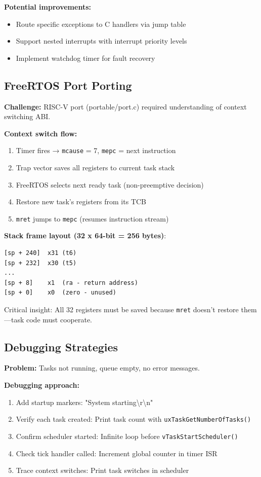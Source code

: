 \documentclass[conference]{IEEEtran}
\begin{document}
\textbf{Potential improvements:} 
\begin{itemize}
    \item Route specific exceptions to C handlers via jump table
    \item Support nested interrupts with interrupt priority levels
    \item Implement watchdog timer for fault recovery
\end{itemize}

\subsection{FreeRTOS Port Porting}
\textbf{Challenge:} RISC-V port (portable/port.c) required understanding of context switching ABI.

\textbf{Context switch flow:}
\begin{enumerate}
    \item Timer fires → \texttt{mcause} = 7, \texttt{mepc} = next instruction
    \item Trap vector saves all registers to current task stack
    \item FreeRTOS selects next ready task (non-preemptive decision)
    \item Restore new task's registers from its TCB
    \item \texttt{mret} jumps to \texttt{mepc} (resumes instruction stream)
\end{enumerate}

\textbf{Stack frame layout (32 x 64-bit = 256 bytes)}:
\begin{lstlisting}
[sp + 240]  x31 (t6)
[sp + 232]  x30 (t5)
...
[sp + 8]    x1  (ra - return address)
[sp + 0]    x0  (zero - unused)
\end{lstlisting}

Critical insight: All 32 registers must be saved because \texttt{mret} doesn't restore them—task code must cooperate.

\subsection{Debugging Strategies}
\textbf{Problem:} Tasks not running, queue empty, no error messages.

\textbf{Debugging approach:}
\begin{enumerate}
    \item Add startup markers: "System starting\textbackslash r\textbackslash n"
    \item Verify each task created: Print task count with \texttt{uxTaskGetNumberOfTasks()}
    \item Confirm scheduler started: Infinite loop before \texttt{vTaskStartScheduler()}
    \item Check tick handler called: Increment global counter in timer ISR
    \item Trace context switches: Print task switches in scheduler
\end{enumerate}
\end{document}

